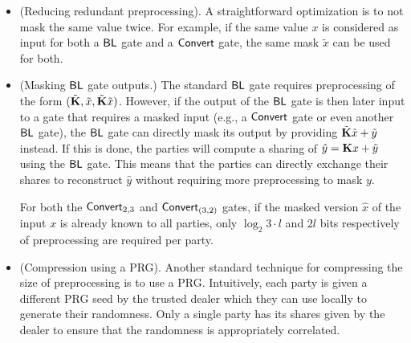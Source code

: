 \begin{itemize}

  \item (Reducing redundant preprocessing).
  A straightforward optimization is to not mask the same value twice. For example, if the same value $x$ is considered as input for both a $\textnormal{\textsf{BL}}$ gate and a $\textnormal{\textsf{Convert}}$ gate, the same mask $\tilde{x}$ can be used for both. 

  \item (Masking $\textnormal{\textsf{BL}}$ gate outputs.)
  The standard $\textnormal{\textsf{BL}}$ gate requires preprocessing of the form $(\tilde{\mat{K}}, \tilde{x}, \tilde{\mat{K}}\tilde{x})$. However, if the output of the $\textnormal{\textsf{BL}}$ gate is then later input to a gate that requires a masked input (e.g., a $\textnormal{\textsf{Convert}}$ gate or even another $\textnormal{\textsf{BL}}$ gate), the $\textnormal{\textsf{BL}}$ gate can directly mask its output by providing $\tilde{\mat{K}}\tilde{x} + \tilde{y}$ instead. If this is done, the parties will compute a sharing of $\hat{y} = \mat{K}x + \tilde{y}$ using the $\textnormal{\textsf{BL}}$ gate. This means that the parties can directly exchange their shares to reconstruct $\hat{y}$ without requiring more preprocessing to mask $y$.

  For both the $\textnormal{\textsf{Convert}}_{2,3}$ and $\textnormal{\textsf{Convert}}_{(3,2)}$ gates, if the masked version $\hat{x}$ of the input $x$ is already known to all parties, only $\log_2{3} \cdot l$ and $2l$ bits respectively of preprocessing are required per party. 

 
  \item (Compression using a PRG).
  Another standard technique for compressing the size of preprocessing is to use a PRG. Intuitively, each party is given a different PRG seed by the trusted dealer which they can use locally to generate their randomness. Only a single party has its shares given by the dealer to ensure that the randomness is appropriately correlated. 


\end{itemize}

